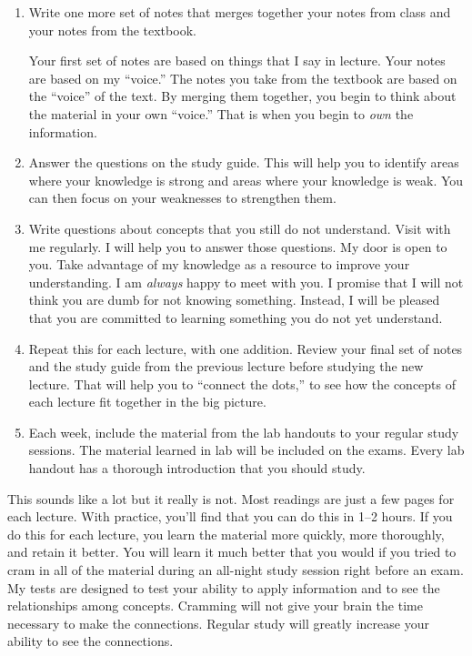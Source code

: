 \documentclass[letterpaper]{tufte-handout}
\begin{document}
\begin{enumerate}
	\item Write one more set of notes that merges together your notes from class and your notes from the textbook.  
	
	Your first set of notes are based on things that I say in lecture. Your notes are based on my “voice.” The notes you take from the textbook are based on the “voice” of the text. By merging them together, you begin to think about the material in your own “voice.” That is when you begin to \emph{own} the information.
	
	\item Answer the questions on the study guide. This will help you to identify areas where your knowledge is strong and areas where your knowledge is weak. You can then focus on your weaknesses to strengthen them.
	
	\item Write questions about concepts that you still do not understand. Visit with me regularly. I will help you to answer those questions. My door is open to you. Take advantage of my knowledge as a resource to improve your understanding. I am \emph{always} happy to meet with you. I promise that I will not think you are dumb for not knowing something. Instead, I will be pleased that you are committed to learning something you do not yet understand. 
	
	\item Repeat this for each lecture, with one addition. Review your final set of notes and the study guide from the previous lecture before studying the new lecture. That will help you to “connect the dots,” to see how the concepts of each lecture fit together in the big picture. 
	
	\item Each week, include the material from the lab handouts to your regular study sessions. The material learned in lab will be included on the exams. Every lab handout has a thorough introduction that you should study.
	
\end{enumerate}

This sounds like a lot but it really is not.  Most readings are just a few pages for each lecture. With practice, you'll find that you can do this in 1–2 hours.  If you do this for each lecture, you learn the material more quickly, more thoroughly, and retain it better. You will learn it much better that you would if you tried to cram in all of the material during an all-night study session right before an exam.  My tests are designed to test your ability to apply information and to see the relationships among concepts. Cramming will not give your brain the time necessary to make the connections. Regular study will greatly increase your ability to see the connections. 
\end{document}
